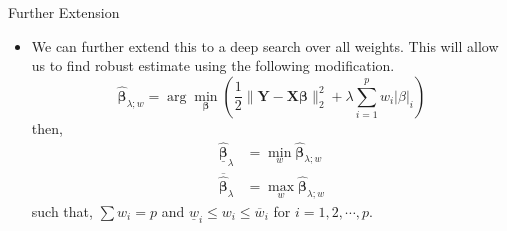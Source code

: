 \documentclass[tikz]{beamer}					%
\newcommand{\bbeta}{\bm{\beta}}
\newcommand{\hb}{\hat{\bbeta}}
\begin{document}
{
\begin{frame}{Further Extension}
\begin{itemize}
    \item We can further extend this to a deep search over all weights. This will allow us
    to find robust estimate using the following modification.
    \begin{equation}
        \hb_{\lambda;w} = \arg\min_{\bbeta} \left(\frac{1}{2}\|\bm{Y}-\bm{X}\bbeta\|_2^2 +\lambda \sum_{i=1}^{p}w_i|\beta|_i \right)
    \end{equation}
    then,
    \begin{align}
        \underline{\hb}_{\lambda} &= \min_{w}\hb_{\lambda;w}\\
        \overline{\hb}_{\lambda} &= \max_{w}\hb_{\lambda;w}
    \end{align}
    such that, $\sum w_i = p$ and 
    $\underline{w}_i\leq w_i\leq \overline{w}_i$ for $i=1,2,\cdots, p$.
\end{itemize}
\end{frame}
}
\end{document}
